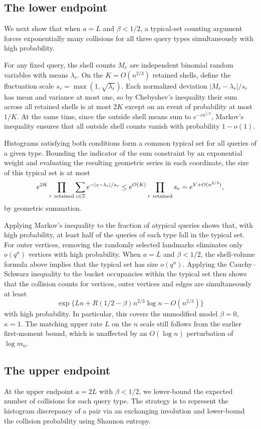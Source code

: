 \subsection{The lower endpoint}
We next show that when $a=L$ and $\beta<1/2$, a typical-set counting argument forces exponentially many collisions for all three query types simultaneously with high probability.

For any fixed query, the shell counts $M_r$ are independent binomial random variables with means $\lambda_r$. On the $K=O(n^{2/3})$ retained shells, define the fluctuation scale $s_r=\max(1,\sqrt{\lambda_r})$. Each normalized deviation $|M_r-\lambda_r|/s_r$ has mean and variance at most one, so by Chebyshev's inequality their sum across all retained shells is at most $2K$ except on an event of probability at most $1/K$. At the same time, since the outside shell means sum to $e^{-c n^{1/3}}$, Markov's inequality ensures that all outside shell counts vanish with probability $1-o(1)$.

Histograms satisfying both conditions form a common typical set for all queries of a given type. Bounding the indicator of the sum constraint by an exponential weight and evaluating the resulting geometric series in each coordinate, the size of this typical set is at most
\[
 e^{2K}\prod_{r\ {\rm retained}}\sum_{z\in\mathbb Z}
 e^{-|z-\lambda_r|/s_r}
 \le e^{O(K)}\prod_{r\ {\rm retained}}s_r=e^{V+O(n^{2/3})},
\]
by geometric summation.

Applying Markov's inequality to the fraction of atypical queries shows that, with high probability, at least half of the queries of each type fall in the typical set. For outer vertices, removing the randomly selected landmarks eliminates only $o(q^n)$ vertices with high probability. When $a=L$ and $\beta<1/2$, the shell-volume formula above implies that the typical set has size $o(q^n)$. Applying the Cauchy--Schwarz inequality to the bucket occupancies within the typical set then shows that the collision counts for vertices, outer vertices and edges are simultaneously at least
\[
 \exp\{Ln+R(1/2-\beta)n^{2/3}\log n-O(n^{2/3})\}
\]
with high probability. In particular, this covers the unmodified model $\beta=0$, $\kappa=1$. The matching upper rate $L$ on the $n$ scale still follows from the earlier first-moment bound, which is unaffected by an $O(\log n)$ perturbation of $\log m_n$.

\subsection{The upper endpoint}
At the upper endpoint $a=2L$ with $\beta<1/2$, we lower-bound the expected number of collisions for each query type. The strategy is to represent the histogram discrepancy of a pair via an exchanging involution and lower-bound the collision probability using Shannon entropy.

